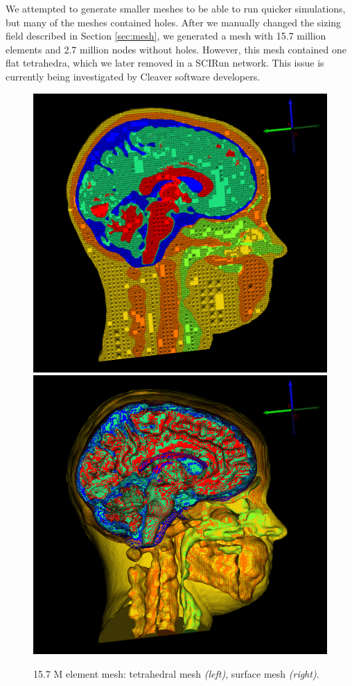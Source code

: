 We attempted to generate smaller meshes to be able to run quicker simulations, but many of the meshes contained holes. After we manually changed the sizing field described in Section \ref{sec:mesh}, we generated a mesh with 15.7 million elements and 2.7 million nodes without holes. However, this mesh contained one flat tetrahedra, which we later removed in a SCIRun network. This issue is currently being investigated by Cleaver software developers.

\begin{figure}[H]
\begin{center}
\includegraphics[width=.49\textwidth]{Figures/smallmesh_2}
\includegraphics[width=.49\textwidth]{Figures/smallmesh_surface}
\caption{15.7 M element mesh: tetrahedral mesh \textit{(left)}, surface mesh \textit{(right)}.}
\label{fig:smallmesh}
\end{center}
\end{figure}

